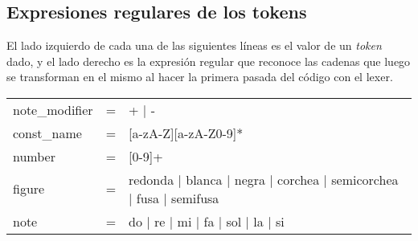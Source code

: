\subsection{Expresiones regulares de los tokens}

El lado izquierdo de cada una de las siguientes líneas es el valor de un \textit{token} dado, y el lado derecho es la expresión regular que reconoce las cadenas que luego se transforman en el mismo al hacer la primera pasada del código con el lexer. \\

\begin{tabular}{l l l}
	note\_modifier & = & + $\vert$ - \\
	const\_name & = & [a-zA-Z][a-zA-Z0-9]* \\
	number & = & [0-9]+ \\
	figure & = & redonda $\vert$ blanca $\vert$ negra $\vert$ corchea $\vert$ semicorchea $\vert$ fusa $\vert$ semifusa \\
	note & = & do $\vert$ re $\vert$ mi $\vert$ fa $\vert$ sol $\vert$ la $\vert$ si \\
\end{tabular}

\clearpage
